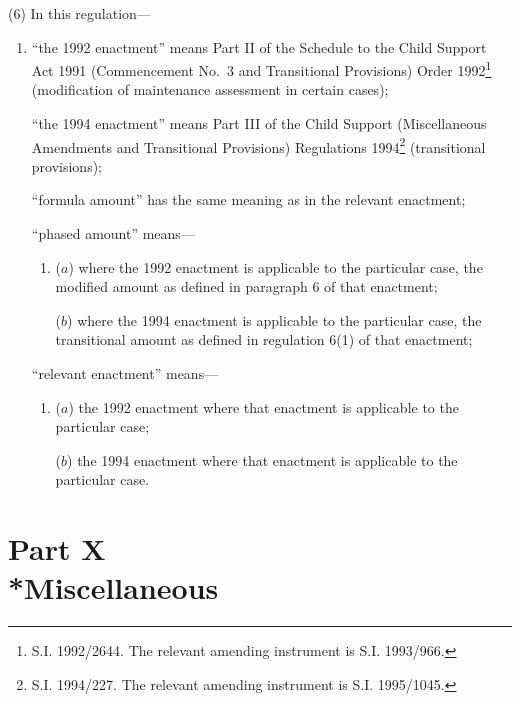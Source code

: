 \documentclass[12pt,a4paper]{article}
\begin{document}
(6) In this regulation—
\begin{enumerate}\item[]
“the 1992 enactment” means Part II of the Schedule to the Child Support Act 1991
(Commencement No.\ 3 and Transitional Provisions) Order 1992\footnote{\frenchspacing S.I. 1992/2644. The relevant amending instrument is S.I. 1993/966.} (modification of
maintenance assessment in certain cases);

“the 1994 enactment” means Part III of the Child Support (Miscellaneous
Amendments and Transitional Provisions) Regulations 1994\footnote{\frenchspacing S.I. 1994/227. The relevant amending instrument is S.I. 1995/1045.} (transitional
provisions);

“formula amount” has the same meaning as in the relevant enactment;

“phased amount” means—
\begin{enumerate}\item[]
($a$) where the 1992 enactment is applicable to the particular case, the modified
amount as defined in paragraph 6 of that enactment;

($b$) where the 1994 enactment is applicable to the particular case, the
transitional amount as defined in regulation 6(1) of that enactment;
\end{enumerate}

“relevant enactment” means—
\begin{enumerate}\item[]
($a$) the 1992 enactment where that enactment is applicable to the particular case;

($b$) the 1994 enactment where that enactment is applicable to the particular case.
\end{enumerate}
\end{enumerate}


\section[Part X --- Miscellaneous]{Part X\\*Miscellaneous}

\renewcommand\parthead{--- Part X}
\end{document}
